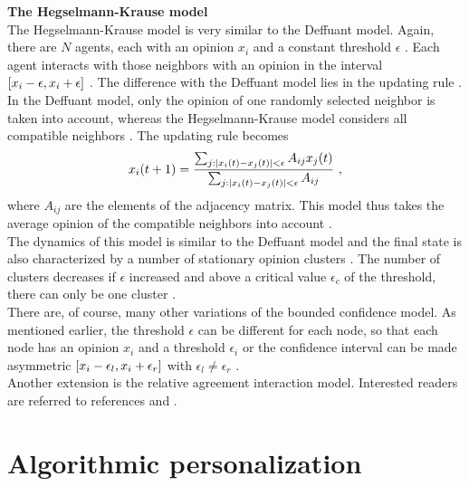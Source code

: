 \documentclass[11 pt , letterpaper , twoside , openright]{book}
\begin{document}
\newline
\textbf{The Hegselmann-Krause model}\\
\newline
The Hegselmann-Krause model is very similar to the Deffuant model. Again, there are $N$ agents, each with an opinion $x_i$ and a constant threshold $\epsilon$ \cite{Castellano2009}. Each agent interacts with those neighbors with an opinion in the interval $\interval{x_i-\epsilon}{x_i+\epsilon}$ \cite{Castellano2009}. The difference with the Deffuant model lies in the updating rule \cite{Castellano2009}. In the Deffuant model, only the opinion of one randomly selected neighbor is taken into account, whereas the Hegselmann-Krause model considers all compatible neighbors \cite{Castellano2009}. The updating rule becomes \cite{Castellano2009}
\begin{equation}
	x_i(t+1) = \frac{\sum_{j:\abs{x_i(t) - x_j(t)}<\epsilon}A_{ij}x_j(t)}{\sum_{j:\abs{x_i(t) - x_j(t)}<\epsilon}A_{ij}} \ ,
\end{equation}
where $A_{ij}$ are the elements of the adjacency matrix. This model thus takes the average opinion of the compatible neighbors into account \cite{Castellano2009}.\\
The dynamics of this model is similar to the Deffuant model and the final state is also characterized by a number of stationary opinion clusters \cite{Castellano2009}. The number of clusters decreases if $\epsilon$ increased and above a critical value $\epsilon_c$ of the threshold, there can only be one cluster \cite{Castellano2009}.\\
\newline
There are, of course, many other variations of the bounded confidence model. As mentioned earlier, the threshold $\epsilon$ can be different for each node, so that each node has an opinion $x_i$ and a threshold $\epsilon_i$ or the confidence interval can be made asymmetric $\interval{x_i - \epsilon_l}{x_i + \epsilon_r}$ with $\epsilon_l \neq
\epsilon_r$ \cite{Krause2002}.\\
Another extension is the relative agreement interaction model. Interested readers are referred to references \cite{Deffuant2006} and \cite{Deffuant2002}.

\section{Algorithmic personalization}\label{filter}
\end{document}
